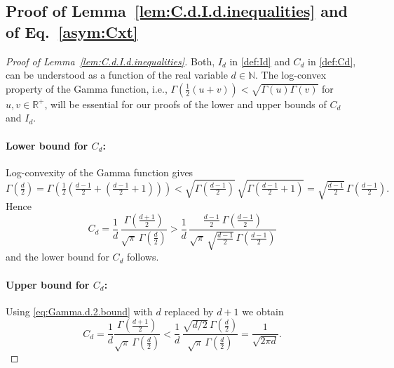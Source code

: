 \documentclass[12pt]{article}
\begin{document}


\begin{appendix}
\section{Proof of Lemma~\ref{lem:C.d.I.d.inequalities} and of Eq.~\eqref{asym:Cxt}}\label{sec_dist_int} 

\begin{proof}[Proof of Lemma~\ref{lem:C.d.I.d.inequalities}] 

Both, $I_d$ in \eqref{def:Id} and $C_d$ in \eqref{def:Cd}, can be understood as a function of the real variable $d \in \mathbb{N}$.  
%
The log-convex property of the Gamma function, i.e., $\Gamma(\tfrac{1}{2}(u+v)) < \sqrt{\Gamma(u) \Gamma(v)}$ for $u,v \in \mathbb{R}^+$, will be essential for our proofs of the lower and upper bounds of $C_d$ and $I_d$. 

\paragraph{Lower bound for $C_d$:} 
Log-convexity of the Gamma function gives
\begin{equation}
\label{eq:Gamma.d.2.bound}
\Gamma(\tfrac{d}{2}) 
= \Gamma(\tfrac{1}{2}( \tfrac{d-1}{2} + (\tfrac{d-1}{2} + 1))) 
< \sqrt{\Gamma(\tfrac{d-1}{2})} \, \sqrt{\Gamma(\tfrac{d-1}{2} + 1 )} = \sqrt{\tfrac{d-1}{2}} \, \Gamma(\tfrac{d-1}{2}).
\end{equation}
Hence
\begin{equation*}
C_d = \frac{1}{d} \, \frac{\Gamma( \tfrac{d+1}{2} )}{\sqrt{\pi} \, \Gamma( \tfrac{d}{2} )} > \frac{1}{d} \, \frac{\tfrac{d-1}{2} \ \Gamma(\tfrac{d-1}{2})}{\sqrt{\pi} \, \sqrt{\tfrac{d-1}{2}} \, \Gamma( \tfrac{d-1}{2} )}
\end{equation*}
and the lower bound for $C_d$ follows. 

\paragraph{Upper bound for $C_d$:} Using \eqref{eq:Gamma.d.2.bound} with $d$ replaced by $d+1$ we obtain 
\begin{equation*}
C_d = \frac{1}{d} \frac{\Gamma(\tfrac{d+1}{2})}{\sqrt{\pi} \, \Gamma(\tfrac{d}{2})} < \frac{1}{d} \, \frac{\sqrt{d/2} \, \Gamma(\tfrac{d}{2})}{\sqrt{\pi} \, \Gamma(\tfrac{d}{2})} = \frac{1}{\sqrt{2\pi d}}.
\end{equation*}



\end{proof}
\end{appendix}
\end{document}

